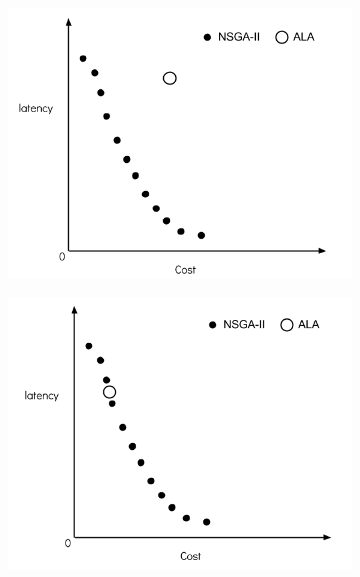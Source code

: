 \documentclass{llncs}
\begin{document}
\begin{figure}[H]
	\centering
	\begin{subfigure}[b]{0.4\textwidth}
		\includegraphics[width=\textwidth]{pics/1.png}
		\caption{}
	\end{subfigure}
	\begin{subfigure}[b]{0.4\textwidth}
		\includegraphics[width=\textwidth]{pics/2.png}
		\caption{}
	\end{subfigure}



\end{figure}
\end{document}
